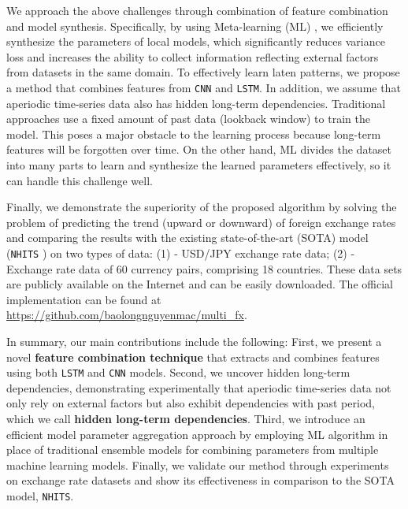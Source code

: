 \documentclass[aps,prb,groupedaddress,twocolumn,showpacs,dvipdfmx,superscriptaddress,pdftex]{revtex4-2}
\begin{document}
We approach the above challenges through combination of feature combination and model synthesis. Specifically, by using Meta-learning (ML) \cite{finn2017model}, we efficiently synthesize the parameters of local models, which significantly reduces variance loss and increases the ability to collect information reflecting external factors from datasets in the same domain. To effectively learn laten patterns, we propose a method that combines features from \verb|CNN| and \verb|LSTM|. In addition, we assume that aperiodic time-series data also has hidden long-term dependencies. Traditional approaches use a fixed amount of past data (lookback window) to train the model. This poses a major obstacle to the learning process because long-term features will be forgotten over time. On the other hand, ML divides the dataset into many parts to learn and synthesize the learned parameters effectively, so it can handle this challenge well.

\vspace{2mm}


Finally, we demonstrate the superiority of the proposed algorithm by solving the problem of predicting the trend (upward or downward) of foreign exchange rates and comparing the results with the existing state-of-the-art (SOTA) model (\verb|NHITS| \cite{challu2023nhits}) on two types of data: (1) - USD/JPY exchange rate data; (2) - Exchange rate data of 60 currency pairs, comprising 18 countries. These data sets are publicly available on the Internet and can be easily downloaded. The official implementation can be found at \url{https://github.com/baolongnguyenmac/multi_fx}.

\vspace{2mm}

In summary, our main contributions include the following: First, we present a novel \textbf{feature combination technique} that extracts and combines features using both \verb|LSTM| and \verb|CNN| models. Second, we uncover hidden long-term dependencies, demonstrating experimentally that aperiodic time-series data not only rely on external factors but also exhibit dependencies with past period, which we call \textbf{hidden long-term dependencies}. Third, we introduce an efficient model parameter aggregation approach by employing ML algorithm in place of traditional ensemble models for combining parameters from multiple machine learning models. Finally, we validate our method through experiments on exchange rate datasets and show its effectiveness in comparison to the SOTA model, \verb|NHITS|.
\end{document}
